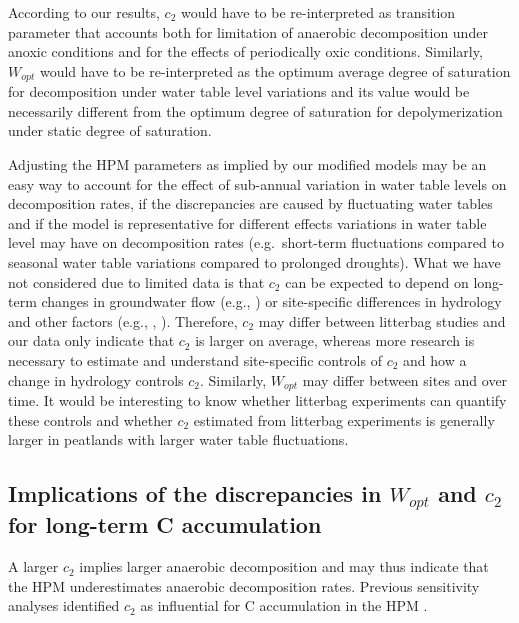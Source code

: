 \documentclass[esd, manuscript]{copernicus}
\begin{document}
According to our results, \(c_2\) would have to be re-interpreted as transition parameter that accounts both for limitation of anaerobic decomposition under anoxic conditions and for the effects of periodically oxic conditions. Similarly, \(W_{opt}\) would have to be re-interpreted as the optimum average degree of saturation for decomposition under water table level variations and its value would be necessarily different from the optimum degree of saturation for depolymerization under static degree of saturation.

Adjusting the HPM parameters as implied by our modified models may be an easy way to account for the effect of sub-annual variation in water table levels on decomposition rates, if the discrepancies are caused by fluctuating water tables and if the model is representative for different effects variations in water table level may have on decomposition rates (e.g.~short-term fluctuations compared to seasonal water table variations compared to prolonged droughts). What we have not considered due to limited data is that \(c_2\) can be expected to depend on long-term changes in groundwater flow (e.g., \citet{Siegel.1995}) or site-specific differences in hydrology and other factors (e.g., \citet{Treat.2021}, \citet{Treat.2022}). Therefore, \(c_2\) may differ between litterbag studies and our data only indicate that \(c_2\) is larger on average, whereas more research is necessary to estimate and understand site-specific controls of \(c_2\) and how a change in hydrology controls \(c_2\). Similarly, \(W_{opt}\) may differ between sites and over time. It would be interesting to know whether litterbag experiments can quantify these controls and whether \(c_2\) estimated from litterbag experiments is generally larger in peatlands with larger water table fluctuations.

\hypertarget{out-discussion-5}{%
\subsection{\texorpdfstring{Implications of the discrepancies in \(W_{opt}\) and \(c_2\) for long-term C accumulation}{Implications of the discrepancies in W\_\{opt\} and c\_2 for long-term C accumulation}}\label{out-discussion-5}}

A larger \(c_2\) implies larger anaerobic decomposition and may thus indicate that the HPM underestimates anaerobic decomposition rates. Previous sensitivity analyses identified \(c_2\) as influential for C accumulation in the HPM \citep{Quillet.2013, Quillet.2013a}.
\end{document}
